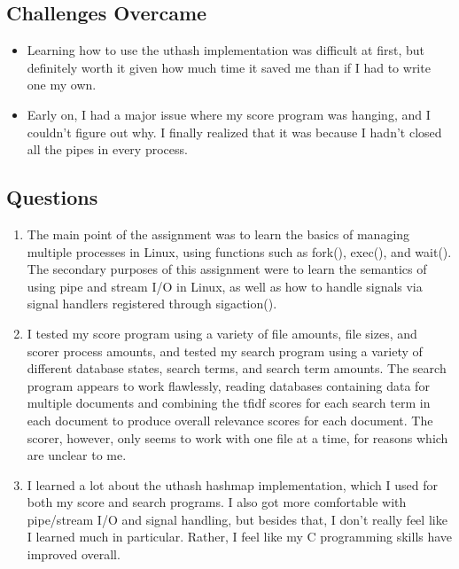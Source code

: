 \documentclass[letterpaper,10pt,fleqn]{article}
\numberwithin{equation}{section}
\begin{document}
\subsection*{Challenges Overcame}
\begin{itemize}
    \item Learning how to use the uthash implementation was difficult at first, but definitely worth it given how much time it saved me than if I had to write one my own.
    \item Early on, I had a major issue where my score program was hanging, and I couldn't figure out why.  I finally realized that it was because I hadn't closed all the pipes in every process.
\end{itemize}

\subsection*{Questions}
\begin{enumerate}
    \item The main point of the assignment was to learn the basics of managing multiple processes in Linux, using functions such as fork(), exec(), and wait().  The secondary purposes of this assignment were to learn the semantics of using pipe and stream I/O in Linux, as well as how to handle signals via signal handlers registered through sigaction().
    \item I tested my score program using a variety of file amounts, file sizes, and scorer process amounts, and tested my search program using a variety of different database states, search terms, and search term amounts.  The search program appears to work flawlessly, reading databases containing data for multiple documents and combining the tfidf scores for each search term in each document to produce overall relevance scores for each document.  The scorer, however, only seems to work with one file at a time, for reasons which are unclear to me.
    \item I learned a lot about the uthash hashmap implementation, which I used for both my score and search programs.  I also got more comfortable with pipe/stream I/O and signal handling, but besides that, I don't really feel like I learned much in particular.  Rather, I feel like my C programming skills have improved overall.
\end{enumerate}
\end{document}
